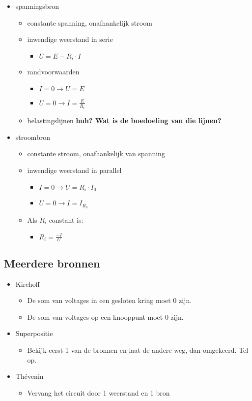 \documentclass[11pt]{article}
\let\originalitem\item
\renewcommand{\item}{\originalitem[]}
\newcommand{\Newpage}{\end{preview}\begin{preview}}
\begin{document}
\begin{preview}
\begin{itemize}
\item spanningsbron
	\begin{itemize}
		\item constante spanning, onafhankelijk stroom
		\item inwendige weerstand in serie
			\begin{itemize}
				\item $U = E - R_i \cdot I$
			\end{itemize}
		\item randvoorwaarden
		\begin{itemize}
			\item $I = 0 \rightarrow U = E$
			\item $U = 0 \rightarrow I = \frac{E}{R_i}$
		\end{itemize}
		\item belastingslijnen \textbf{huh? Wat is de boedoeling van die lijnen?}
	\end{itemize}
\item stroombron
	\begin{itemize}
		\item constante stroom, onafhankelijk van spanning
		\item inwendige weerstand in parallel
		\begin{itemize}
			\item $I = 0 \rightarrow U = R_i \cdot I_0$
			\item $U = 0 \rightarrow I = I_{R_b}$
		\end{itemize}
		\item Als $R_i$ constant is:
		\begin{itemize}
			\item $R_i = \frac{-I}{U}$
		\end{itemize}
	\end{itemize}
\end{itemize}

\Newpage
\section{Meerdere bronnen}

\begin{itemize}
	\item Kirchoff
	\begin{itemize}
		\item De som van voltages in een gesloten kring moet 0 zijn.
		\item De som van voltages op een knooppunt moet 0 zijn.
	\end{itemize}
	\item Superpositie
	\begin{itemize}
		\item Bekijk eerst 1 van de bronnen en laat de andere weg, dan omgekeerd. Tel op.
	\end{itemize}
	\item Th\'evenin
	\begin{itemize}
		\item Vervang het circuit door 1 weerstand en 1 bron
	\end{itemize}
\end{itemize}


\end{preview}
\end{document}
